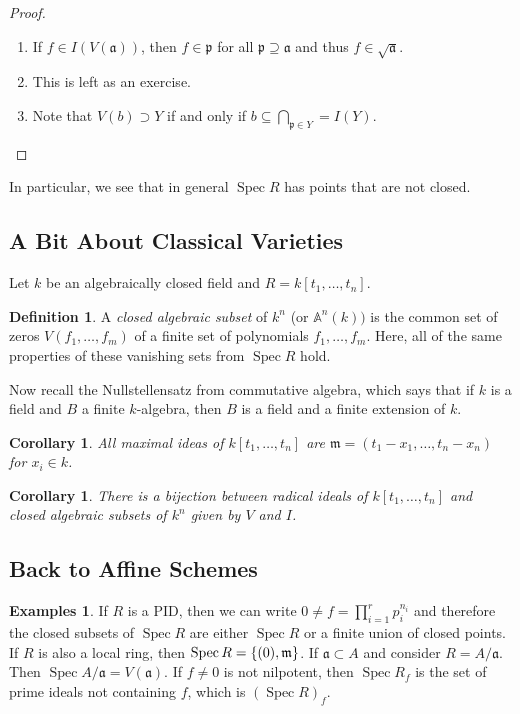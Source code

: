 \documentclass[leqno, openany]{memoir}
\newtheorem{cor}[thm]{Corollary}
\theoremstyle{definition}
\newtheorem{defn}[thm]{Definition}
\newtheorem{exms}[thm]{Examples}
\theoremstyle{remark}
\theoremstyle{plain}
\theoremstyle{definition}
\theoremstyle{remark}
\newcommand{\A}{\mathbb{A}}
\newcommand{\mf}[1]{\mathfrak{#1}}
\DeclareMathOperator{\Spec}{Spec}
\begin{document}
\begin{proof} \begin{enumerate} \item If $f \in I(V(\mf{a}))$, then $f \in
    \mf{p}$ for all $\mf{p} \supseteq \mf{a}$ and thus $f \in \sqrt{\mf{a}}$.
\item This is left as an exercise.  \item Note that $V(b) \supset Y$ if and
    only if $b \subseteq \bigcap_{\mf{p} \in Y} = I(Y)$.  \end{enumerate}
\end{proof}

In particular, we see that in general $\Spec R$ has points that are not closed.

\subsection{A Bit About Classical Varieties}%
\label{sub:a_bit_about_classical_varieties}

Let $k$ be an algebraically closed field and $R = k[t_1, \ldots, t_n]$. 

\begin{defn} A \textit{closed algebraic subset} of $k^n$ (or $\A^n(k))$ is the
    common set of zeros $V(f_1, \ldots, f_m)$ of a finite set of polynomials
    $f_1, \ldots, f_m$. Here, all of the same properties of these vanishing
    sets from $\Spec R$ hold.  \end{defn}

Now recall the Nullstellensatz from commutative algebra, which says that if $k$
is a field and $B$ a finite $k$-algebra, then $B$ is a field and a finite
extension of $k$.

\begin{cor} All maximal ideas of $k[t_1, \ldots, t_n]$ are $\mf{m} = (t_1 -
x_1, \ldots, t_n - x_n)$ for $x_i \in k$.  \end{cor}

\begin{cor} There is a bijection between radical ideals of $k[t_1, \ldots,
t_n]$ and closed algebraic subsets of $k^n$ given by $V$ and $I$.  \end{cor}

\subsection{Back to Affine Schemes}%

\begin{exms} If $R$ is a PID, then we can write $0 \neq f = \prod_{i=1}^r
    p_i^{n_i}$ and therefore the closed subsets of $\Spec R$ are either $\Spec
    R$ or a finite union of closed points. If $R$ is also a local ring, then
    $\Spec R = \qty{(0), \mf{m}}$. If $\mf{a} \subset A$ and consider $R =
    A/\mf{a}$. Then $\Spec A/\mf{a} = V(\mf{a})$. If $f \neq 0$ is not
    nilpotent, then $\Spec R_f$ is the set of prime ideals not containing $f$,
    which is ${(\Spec R)}_f$.  \end{exms}
\end{document}
